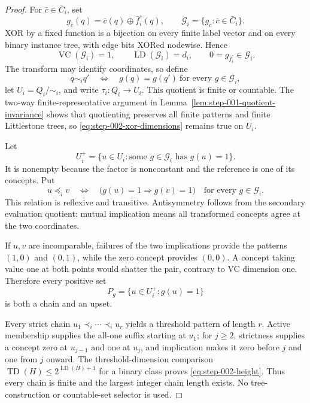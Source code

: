 \begin{proof}
For \(\bar c\in\bar C_i\), set
\begin{equation}\label{eq:step-002-xor-class}
g_{\bar c}(q)=\bar c(q)\oplus\bar f_i^\circ(q),
\qquad \mathcal G_i=\{g_{\bar c}:\bar c\in\bar C_i\}.
\end{equation}
XOR by a fixed function is a bijection on every finite label vector and on
every binary instance tree, with edge bits XORed nodewise.  Hence
\begin{equation}\label{eq:step-002-xor-dimensions}
\operatorname{VC}(\mathcal G_i)=1,\qquad
\operatorname{LD}(\mathcal G_i)=d_i,\qquad
0=g_{\bar f_i^\circ}\in\mathcal G_i.
\end{equation}
The transform may identify coordinates, so define
\[
q\sim_iq'\quad\Longleftrightarrow\quad
g(q)=g(q')\ \text{for every }g\in\mathcal G_i,
\]
let \(U_i=Q_i/{\sim_i}\), and write \(\tau_i:Q_i\to U_i\).  This quotient
is finite or countable.  The two-way finite-representative argument in
Lemma~\ref{lem:step-001-quotient-invariance} shows that quotienting preserves
all finite patterns and finite Littlestone trees, so
\eqref{eq:step-002-xor-dimensions} remains true on \(U_i\).

Let
\[
U_i^+=\{u\in U_i:\text{some }g\in\mathcal G_i\text{ has }g(u)=1\}.
\]
It is nonempty because the factor is nonconstant and the reference is one
of its concepts.  Put
\begin{equation}\label{eq:step-002-implication-order}
u\preceq_i v
\quad\Longleftrightarrow\quad
\bigl(g(u)=1\Longrightarrow g(v)=1\bigr)
\quad\text{for every }g\in\mathcal G_i.
\end{equation}
This relation is reflexive and transitive.  Antisymmetry follows from the
secondary evaluation quotient: mutual implication means all transformed
concepts agree at the two coordinates.

If \(u,v\) are incomparable, failures of the two implications provide the
patterns \((1,0)\) and \((0,1)\), while the zero concept provides
\((0,0)\).  A concept taking value one at both points would shatter the pair,
contrary to VC dimension one.  Therefore every positive set
\begin{equation}\label{eq:step-002-positive-set}
P_g=\{u\in U_i^+:g(u)=1\}
\end{equation}
is both a chain and an upset.

Every strict chain \(u_1\prec_i\cdots\prec_i u_r\) yields a threshold
pattern of length \(r\).  Active membership supplies the all-one suffix
starting at \(u_1\); for \(j\ge2\), strictness supplies a concept zero at
\(u_{j-1}\) and one at \(u_j\), and implication makes it zero before \(j\)
and one from \(j\) onward.  The threshold-dimension comparison
\(\operatorname{TD}(H)\le2^{\operatorname{LD}(H)+1}\) for a binary class
\citep{yan2025vc1} proves \eqref{eq:step-002-height}.  Thus every chain is
finite and the largest integer chain length exists.  No tree-construction
or countable-set selector is used.


\end{proof}
